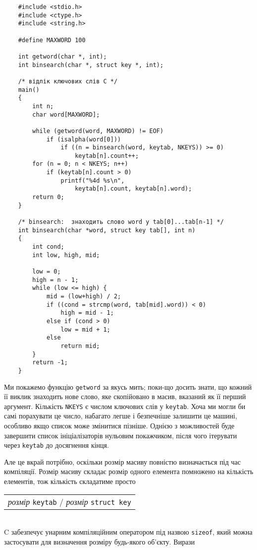 \documentclass[a4paper,12pt]{book}
\begin{document}
  \begin{verbatim}
    #include <stdio.h>
    #include <ctype.h>
    #include <string.h>

    #define MAXWORD 100

    int getword(char *, int);
    int binsearch(char *, struct key *, int);

    /* відлік ключових слів C */
    main()
    {
        int n;
        char word[MAXWORD];

        while (getword(word, MAXWORD) != EOF)
            if (isalpha(word[0]))
                if ((n = binsearch(word, keytab, NKEYS)) >= 0)
                    keytab[n].count++;
        for (n = 0; n < NKEYS; n++)
            if (keytab[n].count > 0)
                printf("%4d %s\n",
                    keytab[n].count, keytab[n].word);
        return 0;
    }

    /* binsearch:  знаходить слово word у tab[0]...tab[n-1] */
    int binsearch(char *word, struct key tab[], int n)
    {
        int cond;
        int low, high, mid;

        low = 0;
        high = n - 1;
        while (low <= high) {
            mid = (low+high) / 2;
            if ((cond = strcmp(word, tab[mid].word)) < 0)
                high = mid - 1;
            else if (cond > 0)
                low = mid + 1;
            else
                return mid;
        }
        return -1;
    }
  \end{verbatim}

  Ми покажемо функцію \texttt{getword} за якусь мить; поки-що досить знати, що кожний її
  виклик знаходить нове слово, яке скопійовано в масив, вказаний як її перший аргумент.
  Кількість \texttt{NKEYS} є числом ключових слів у \texttt{keytab}. Хоча ми могли би самі
  порахувати це число, набагато легше і безпечніше залишити це машині, особливо якщо
  список може змінитися пізніше. Однією з можливостей буде завершити список
  ініціалізаторів нульовим покажчиком, після чого ітерувати через \texttt{keytab} до
  досягнення кінця.

  Але це вкрай потрібно, оскільки розмір масиву повністю визначається під час компіляції.
  Розмір масиву складає розмір одного елемента помножено на кількість елементів, тож
  кількість складатиме просто

  \vspace{12pt}
  \begin{tabular}{l}
  \textit{розмір} \texttt{keytab} \texttt{\mbox{$/$}} \textit{розмір} \texttt{struct key} \\
  \end{tabular}
  \vspace{12pt}
  \\
  C забезпечує унарним компіляційним оператором під назвою \texttt{sizeof}, який
  можна застосувати для визначення розміру будь-якого об'єкту. Вирази
  
\end{document}
